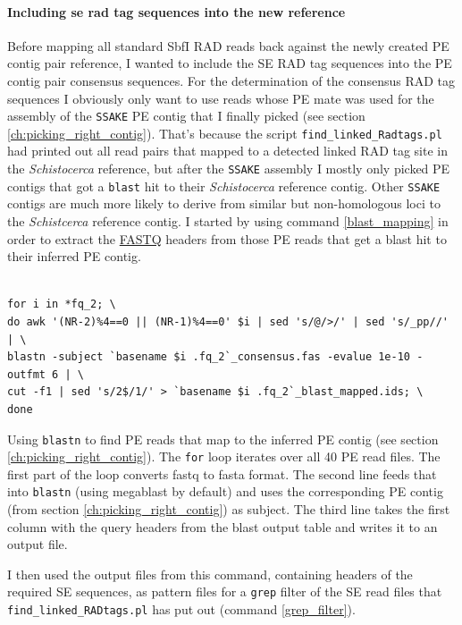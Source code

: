 \documentclass[a4paper,12pt,times,print,index,custombib,custommargin]{PhDThesisPSnPDF}\usepackage[]{graphicx}\usepackage[]{color}
\begin{document}
\paragraph{Including se rad tag sequences into the new reference}
Before mapping all standard SbfI RAD reads back against the newly created PE contig pair reference, I wanted to include the SE \gls{RAD tag} sequences into the PE contig pair consensus sequences. For the determination of the consensus \gls{RAD tag} sequences I obviously only want to use reads whose PE mate was used for the assembly of the \texttt{SSAKE} PE contig that I finally picked (see section \ref{ch:picking_right_contig}). That's because the script \texttt{find\_linked\_Radtags.pl} had printed out all read pairs that mapped to a detected \gls{linked RAD tag site} in the \textit{Schistocerca} reference, but after the \texttt{SSAKE} assembly I mostly only picked PE contigs that got a \texttt{blast} hit to their \textit{Schistocerca} reference contig. Other \texttt{SSAKE} contigs are much more likely to derive from similar but non-homologous loci to the \textit{Schistcerca} reference contig. I started by using command \ref{blast_mapping} in order to extract the \href{http://en.wikipedia.org/wiki/FASTQ_format}{FASTQ} headers from those PE reads that get a blast hit to their inferred PE contig.
%
\begin{cmd}
\captionsetup{type=cmd}
\begin{Verbatim}[fontsize=\scriptsize, formatcom=\color{darkgray}]

for i in *fq_2; \
do awk '(NR-2)%4==0 || (NR-1)%4==0' $i | sed 's/@/>/' | sed 's/_pp//' | \
blastn -subject `basename $i .fq_2`_consensus.fas -evalue 1e-10 -outfmt 6 | \
cut -f1 | sed 's/2$/1/' > `basename $i .fq_2`_blast_mapped.ids; \
done
\end{Verbatim}
\caption{\small Using \texttt{blastn} to find PE reads that map to the inferred PE contig (see section \vref{ch:picking_right_contig}). The \texttt{for} loop iterates over all 40 PE read files. The first part of the loop converts fastq to fasta format. The second line feeds that into \texttt{blastn} (using megablast by default) and uses the corresponding PE contig (from section \ref{ch:picking_right_contig}) as subject. The third line takes the first column with the query headers from the blast output table and writes it to an output file.
}
\label{blast_mapping} 
\end{cmd}
%
I then used the output files from this command, containing headers of the required SE sequences, as pattern files for a \texttt{grep} filter of the SE read files that \texttt{find\_linked\_RADtags.pl} has put out (command \ref{grep_filter}).
\end{document}
